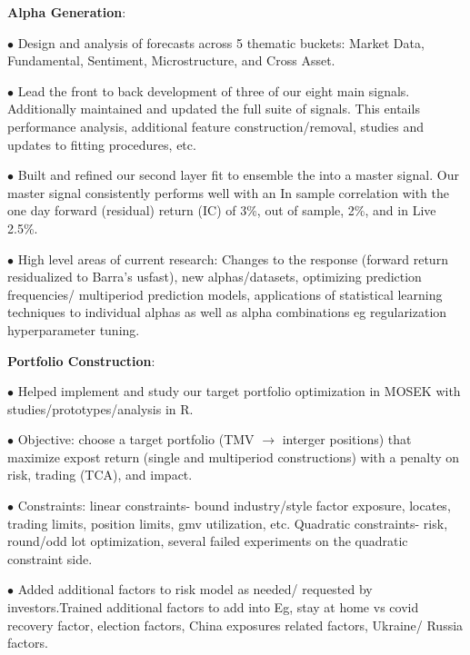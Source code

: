 \documentclass[a4paper,20pt]{article}
\newcommand{\resumeItem}[2]{
  \item\small{
    \textbf{#1}{: #2 \vspace{-2pt}}
  }
}
\begin{document}
    \resumeItem{Alpha Generation}\\ 
      $\bullet$ Design and analysis of forecasts across 5 thematic buckets:
      Market Data, Fundamental, Sentiment, Microstructure, and Cross
      Asset.

      $\bullet$ Lead the front to back development of three of our
      eight main signals. Additionally maintained and updated the full
      suite of signals. This entails performance analysis, additional
      feature construction/removal, studies and updates to fitting
      procedures, etc.

      $\bullet$ Built and refined our second layer fit to ensemble the into a
      master signal. Our master signal consistently performs well with
      an In sample correlation with the one day forward (residual)
      return (IC) of 3\%, out of sample, 2\%, and in Live 2.5\%.

      $\bullet$ High level areas of current research: Changes to the
      response (forward return residualized to Barra's usfast), new
      alphas/datasets, optimizing prediction frequencies/ multiperiod
      prediction models, applications of statistical learning
      techniques to individual alphas as well as alpha combinations eg
      regularization hyperparameter tuning.

      \resumeItem{Portfolio Construction}\\

      $\bullet$ Helped implement and study our target portfolio
      optimization in MOSEK with studies/prototypes/analysis in R.

      $\bullet$ Objective: choose a target portfolio (TMV $\rightarrow$ interger  positions) that maximize
      expost return (single and multiperiod constructions) with a
      penalty on risk, trading (TCA), and impact.

      $\bullet$ Constraints: linear constraints- bound industry/style
      factor exposure, locates, trading limits, position limits, gmv
      utilization, etc. Quadratic constraints- risk, round/odd lot
      optimization, several failed experiments on the quadratic
      constraint side.

      $\bullet$ Added additional factors to risk model as needed/
      requested by investors.Trained additional factors to add into
      Eg, stay at home vs covid recovery factor, election factors,
      China exposures related factors, Ukraine/ Russia
      factors.

\end{document}

